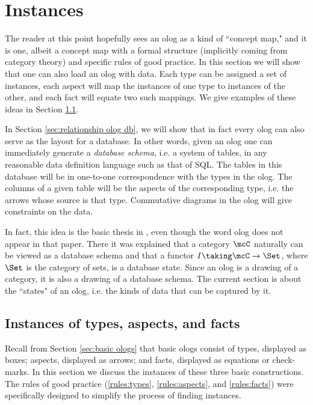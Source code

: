 \section{Instances}\label{sec:instances}

The reader at this point hopefully sees an olog as a kind of ``concept map," and it is one, albeit a concept map with a formal structure (implicitly coming from category theory) and specific rules of good practice. In this section we will show that one can also load an olog with data. Each type can be assigned a set of instances, each aspect will map the instances of one type to instances of the other, and each fact will equate two such mappings. We give examples of these ideas in Section \ref{sec:instances of taf}. 

In Section \ref{sec:relationship olog db}, we will show that in fact every olog can also serve as the layout for a database. In other words, given an olog one can immediately generate a {\em database schema}, i.e. a system of tables, in any reasonable data definition language such as that of SQL. The tables in this database will be in one-to-one correspondence with the types in the olog. The columns of a given table will be the aspects of the corresponding type, i.e. the arrows whose source is that type. Commutative diagrams in the olog will give constraints on the data.

In fact, this idea is the basic thesis in \cite{Spi-FDM}, even though the word olog does not appear in that paper. There it was explained that a category $\mcC$ naturally can be viewed as a database schema and that a functor $I\taking\mcC\to\Set$, where $\Set$ is the category of sets, is a database state. Since an olog is a drawing of a category, it is also a drawing of a database schema. The current section is about the ``states" of an olog, i.e. the kinds of data that can be captured by it. 

\subsection{Instances of types, aspects, and facts}\label{sec:instances of taf}

Recall from Section \ref{sec:basic ologs} that basic ologs consist of types, displayed as boxes; aspects, displayed as arrows; and facts, displayed as equations or check-marks. In this section we discuss the instances of these three basic constructions.  The rules of good practice (\ref{rules:types}, \ref{rules:aspects}, and \ref{rules:facts}) were specifically designed to simplify the process of finding instances.


